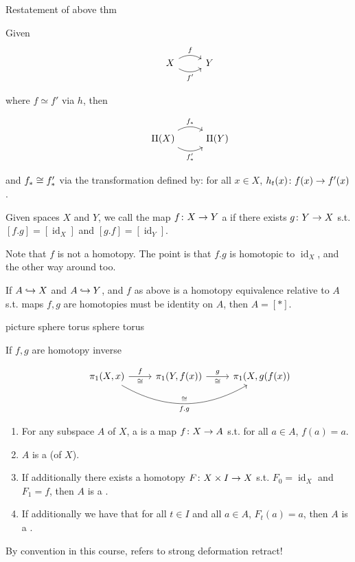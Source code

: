 \documentclass[11pt,leqno,oneside]{amsart}
\numberwithin{thm}{section}
\newcommand{\homotopic}{\simeq}
\newcommand{\fund}[1][1]{\pi_{#1}}
\newcommand{\x}{\times}
\newcommand{\id}{\operatorname{id}}
\begin{document}
\begin{thm}
  Restatement of above thm

  Given
  $$\begin{tikzcd}
    &X \arrow[r, bend left, "f"] \arrow[r, bend right, "f'"'] &Y
  \end{tikzcd}$$

  where $f \homotopic f'$ via $h$, then

  $$\begin{tikzcd}
    &\Pi(X) \arrow[r, bend left, "f_*"] \arrow[r, bend right, "f_*'"'] &\Pi(Y)
  \end{tikzcd}$$

  and $f_* \mathrel{\cong} f_*'$ via the transformation defined by: for all $x \in X$, $h_t(x)\colon f(x) \to f'(x)$.
\end{thm}
\begin{defn}
  Given spaces $X$ and $Y$, we call the map $f\colon X \to Y$ a  if there exists $g\colon Y \to X$ s.t. $[f.g] = [\id_X]$ and $[g.f] = [\id_Y]$.
\end{defn}
\begin{rmk}
  Note that $f$ is not a homotopy.  The point is that $f.g$ is homotopic to $\id_X$, and the other way around too.
\end{rmk}
\begin{rmk}
  If $A \hookrightarrow X$ and $A \hookrightarrow Y$, and $f$ as above is a homotopy equivalence relative to $A$ s.t. maps $f,g$ are homotopies must be identity on $A$, then $A = [*]$.

  picture sphere torus sphere torus

  If $f,g$ are homotopy inverse

  $$\begin{tikzcd}
    &\fund(X,x) \arrow[r, "f", "\isom"'] \arrow[rr, bend right, "\isom", "f.g"'] &\fund(Y, f(x)) \arrow[r, "g", "\isom"'] &\fund(X, g(f(x))
  \end{tikzcd}$$
\end{rmk}
\begin{defn}
  \mbox{}
  \begin{enumerate}
    \item For any subspace $A$ of $X$, a  is a map $f\colon X \to A$ s.t. for all $a \in A$, $f(a) = a$.

    \item $A$ is a  (of $X$).

    \item If additionally there exists a homotopy $F\from X \x I \to X$ s.t. $F_0 = \id_X$ and $F_1 = f$, then $A$ is a .

    \item If additionally we have that for all $t \in I$ and all $a \in A$, $F_t(a) = a$, then $A$ is a .
  \end{enumerate}
  By convention in this course,  refers to strong deformation retract!
\end{defn}
\end{document}
